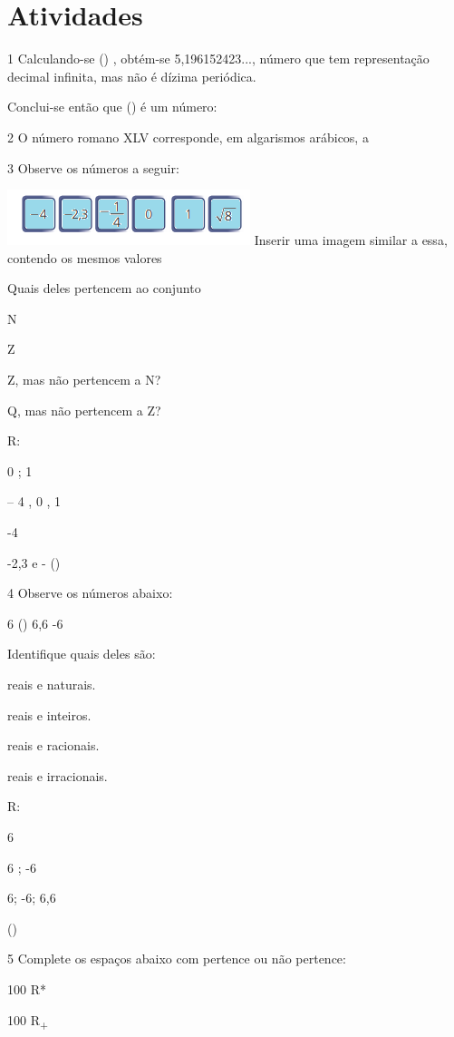 \section{Atividades}

\num{1} Calculando-se () , obtém-se 5,196152423..., número que tem
representação decimal infinita, mas não é dízima periódica.

Conclui-se então que () é um número:


\num{2} O número romano XLV corresponde, em algarismos arábicos, a


\num{3} Observe os números a seguir:

\includegraphics[width=2.79167in,height=0.63542in]{./imgSAEB_8_MAT/media/image1.png}
Inserir uma imagem similar a essa, contendo os mesmos valores

Quais deles pertencem ao conjunto
\item N
\item Z
\item Z, mas não pertencem a N?
\item Q, mas não pertencem a Z?

R:
\item 0 ; 1
\item -- 4 , 0 , 1
\item -4
\item -2,3 e - ()

\num{4} Observe os números abaixo:

6 () 6,6 -6

Identifique quais deles são:
\item reais e naturais.
\item reais e inteiros.
\item reais e racionais.
\item reais e irracionais.

R:
\item 6
\item 6 ; -6
\item 6; -6; 6,6
\item ()

\num{5} Complete os espaços abaixo com pertence ou não pertence:
\item 100 R*
\item 100 R\textsubscript{+}

